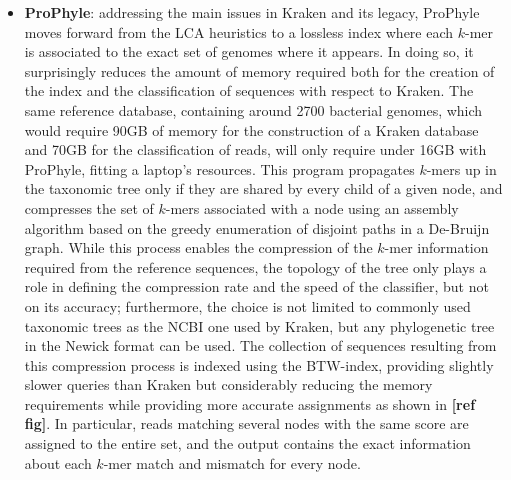 \begin{itemize}
    \item \textbf{ProPhyle}: addressing the main issues in Kraken and its legacy, ProPhyle moves forward from the LCA heuristics to a lossless index where each $k$-mer is associated to the exact set of genomes where it appears. In doing so, it surprisingly reduces the amount of memory required both for the creation of the index and the classification of sequences with respect to Kraken. The same reference database, containing around 2700 bacterial genomes, which would require 90GB of memory for the construction of a Kraken database and 70GB for the classification of reads, will only require under 16GB with ProPhyle, fitting a laptop's resources. This program propagates $k$-mers up in the taxonomic tree only if they are shared by every child of a given node, and compresses the set of $k$-mers associated with a node using an assembly algorithm based on the greedy enumeration of disjoint paths in a De-Bruijn graph. While this process enables the compression of the $k$-mer information required from the reference sequences, the topology of the tree only plays a role in defining the compression rate and the speed of the classifier, but not on its accuracy; furthermore, the choice is not limited to commonly used taxonomic trees as the NCBI one used by Kraken, but any phylogenetic tree in the Newick format can be used. The collection of sequences resulting from this compression process is indexed using the BTW-index, providing slightly slower queries than Kraken but considerably reducing the memory requirements while providing more accurate assignments as shown in \textbf{[ref fig]}. In particular, reads matching several nodes with the same score are assigned to the entire set, and the output contains the exact information about each $k$-mer match and mismatch for every node.
\end{itemize}

